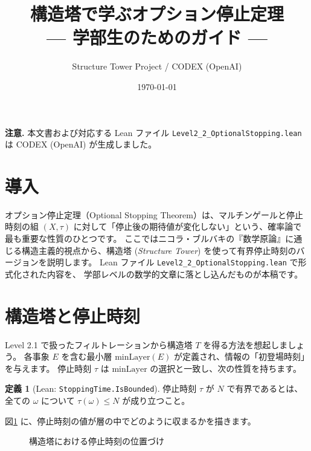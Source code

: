\documentclass[12pt]{ltjsarticle}
\title{構造塔で学ぶオプション停止定理\\{\large --- 学部生のためのガイド ---}}
\author{Structure Tower Project / CODEX (OpenAI)}
\date{\today}
\theoremstyle{definition}
\newtheorem{definition}{定義}[section]
\theoremstyle{plain}
\begin{document}
\maketitle
\tableofcontents

\bigskip
\begin{center}
  \textbf{注意.} 本文書および対応する Lean ファイル
  \texttt{Level2\_2\_OptionalStopping.lean} は CODEX (OpenAI) が生成しました。
\end{center}

\section{導入}

オプション停止定理（Optional Stopping Theorem）は、マルチンゲールと停止時刻の組 $(X,\tau)$
に対して「停止後の期待値が変化しない」という、確率論で最も重要な性質のひとつです。
ここではニコラ・ブルバキの『数学原論』に通じる構造主義的視点から、構造塔
(\emph{Structure Tower}) を使って有界停止時刻のバージョンを説明します。
Lean ファイル \texttt{Level2\_2\_OptionalStopping.lean} で形式化された内容を、
学部レベルの数学的文章に落とし込んだものが本稿です。

\section{構造塔と停止時刻}

Level 2.1 で扱ったフィルトレーションから構造塔 $T$ を得る方法を想起しましょう。
各事象 $E$ を含む最小層 $\mathrm{minLayer}(E)$ が定義され、情報の「初登場時刻」を与えます。
停止時刻 $\tau$ は $\mathrm{minLayer}$ の選択と一致し、次の性質を持ちます。

\begin{definition}[Lean: \texttt{StoppingTime.IsBounded}]
停止時刻 $\tau$ が $N$ で有界であるとは、全ての $\omega$ について $\tau(\omega)\le N$ が成り立つこと。
\end{definition}

図\ref{fig:bounded} に、停止時刻の値が層の中でどのように収まるかを描きます。

\begin{figure}[h]
  \centering
  \caption{構造塔における停止時刻の位置づけ}
  \label{fig:bounded}
\end{figure}
\end{document}
